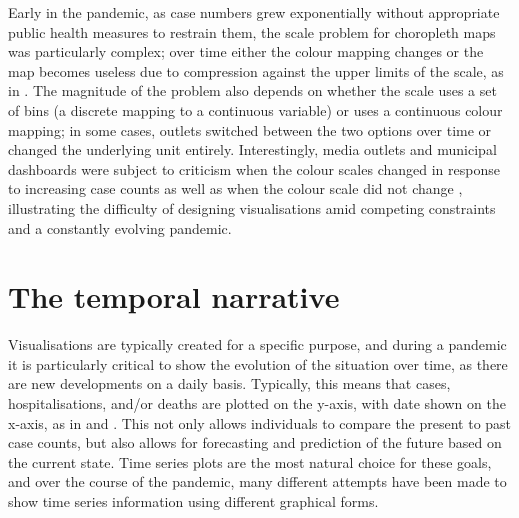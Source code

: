 \documentclass[article]{jdssv}\usepackage[]{graphicx}\usepackage[]{color}
\begin{document}
Early in the pandemic, as case numbers grew exponentially without appropriate public health measures to restrain them, the scale problem for choropleth maps was particularly complex; over time either the colour mapping changes or the map becomes useless due to compression against the upper limits of the scale, as in \citet{panchadsaramIfWeAre2020}. 
The magnitude of the problem also depends on whether the scale uses a set of bins (a discrete mapping to a continuous variable) or uses a continuous colour mapping; in some cases, outlets switched between the two options over time or changed the underlying unit entirely. 
Interestingly, media outlets and municipal dashboards were subject to criticism when the colour scales changed in response to increasing case counts \citep{boeckDataVizDecisionmakingAction2020} as well as when the colour scale did not change \citep{sandalowChiTribGraphicsPleaseUpdate2020}, illustrating the difficulty of designing visualisations amid competing constraints and a constantly evolving pandemic.






\section{The temporal narrative}

Visualisations are typically created for a specific purpose, and during a pandemic it is particularly critical to show the evolution of the situation over time, as there are new developments on a daily basis. 
Typically, this means that cases, hospitalisations, and/or deaths are plotted on the y-axis, with date shown on the x-axis, as in  and . 
This not only allows individuals to compare the present to past case counts, but also allows for forecasting and prediction of the future based on the current state. 
Time series plots are the most natural choice for these goals, and over the course of the pandemic, many different attempts have been made to show time series information using different graphical forms. 
\end{document}

